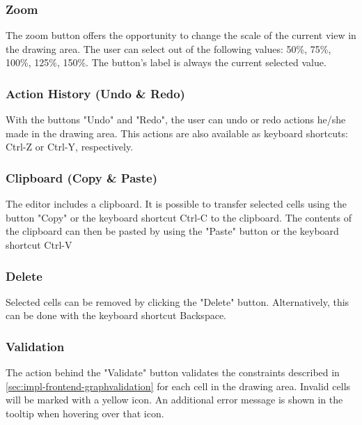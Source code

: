 \documentclass[a4paper,top=25mm,bottom=25mm,12pt,pdftex,halfparskip,twoside,bibtotoc,numbers=noenddot]{scrbook}
\begin{document}
\subsubsection{Zoom}

The zoom button offers the opportunity to change the scale of the current view in the drawing area. The user can select out of the following values: 50\%, 75\%, 100\%, 125\%, 150\%. The button's label is always the current selected value.

\subsubsection{Action History (Undo \& Redo)}

With the buttons "Undo" and "Redo", the user can undo or redo actions he/she made in the drawing area. This actions are also available as keyboard shortcuts: \textsf{Ctrl-Z} or \textsf{Ctrl-Y}, respectively.

\subsubsection{Clipboard (Copy \& Paste)}

The editor includes a clipboard. It is possible to transfer selected cells using the button "Copy" or the keyboard shortcut \textsf{Ctrl-C} to the clipboard.
The contents of the clipboard can then be pasted by using the "Paste" button or the keyboard shortcut \textsf{Ctrl-V}

\subsubsection{Delete}

Selected cells can be removed by clicking the "Delete" button. Alternatively, this can be done with the keyboard shortcut \textsf{Backspace}.

\subsubsection{Validation}

The action behind the "Validate" button validates the constraints described in \ref{sec:impl-frontend-graphvalidation} for each cell in the drawing area. Invalid cells will be marked with a yellow icon. An additional error message is shown in the tooltip when hovering over that icon.
\end{document}
